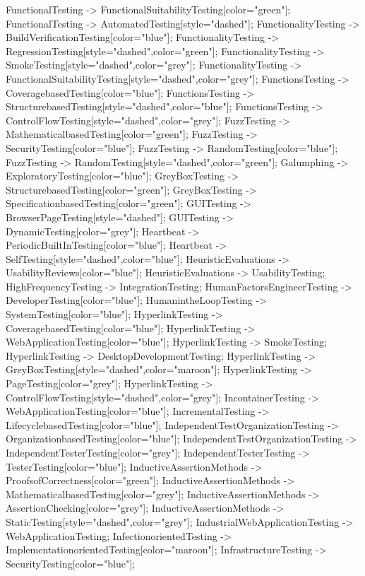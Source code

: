 \documentclass{article}
\begin{document}
{FunctionalTesting -> FunctionalSuitabilityTesting[color="green"];
FunctionalTesting -> AutomatedTesting[style="dashed"];
FunctionalityTesting -> BuildVerificationTesting[color="blue"];
FunctionalityTesting -> RegressionTesting[style="dashed",color="green"];
FunctionalityTesting -> SmokeTesting[style="dashed",color="grey"];
FunctionalityTesting -> FunctionalSuitabilityTesting[style="dashed",color="grey"];
FunctionsTesting -> CoveragebasedTesting[color="blue"];
FunctionsTesting -> StructurebasedTesting[style="dashed",color="blue"];
FunctionsTesting -> ControlFlowTesting[style="dashed",color="grey"];
FuzzTesting -> MathematicalbasedTesting[color="green"];
FuzzTesting -> SecurityTesting[color="blue"];
FuzzTesting -> RandomTesting[color="blue"];
FuzzTesting -> RandomTesting[style="dashed",color="green"];
Galumphing -> ExploratoryTesting[color="blue"];
GreyBoxTesting -> StructurebasedTesting[color="green"];
GreyBoxTesting -> SpecificationbasedTesting[color="green"];
GUITesting -> BrowserPageTesting[style="dashed"];
GUITesting -> DynamicTesting[color="grey"];
Heartbeat -> PeriodicBuiltInTesting[color="blue"];
Heartbeat -> SelfTesting[style="dashed",color="blue"];
HeuristicEvaluations -> UsabilityReviews[color="blue"];
HeuristicEvaluations -> UsabilityTesting;
HighFrequencyTesting -> IntegrationTesting;
HumanFactorsEngineerTesting -> DeveloperTesting[color="blue"];
HumanintheLoopTesting -> SystemTesting[color="blue"];
HyperlinkTesting -> CoveragebasedTesting[color="blue"];
HyperlinkTesting -> WebApplicationTesting[color="blue"];
HyperlinkTesting -> SmokeTesting;
HyperlinkTesting -> DesktopDevelopmentTesting;
HyperlinkTesting -> GreyBoxTesting[style="dashed",color="maroon"];
HyperlinkTesting -> PageTesting[color="grey"];
HyperlinkTesting -> ControlFlowTesting[style="dashed",color="grey"];
IncontainerTesting -> WebApplicationTesting[color="blue"];
IncrementalTesting -> LifecyclebasedTesting[color="blue"];
IndependentTestOrganizationTesting -> OrganizationbasedTesting[color="blue"];
IndependentTestOrganizationTesting -> IndependentTesterTesting[color="grey"];
IndependentTesterTesting -> TesterTesting[color="blue"];
InductiveAssertionMethods -> ProofsofCorrectness[color="green"];
InductiveAssertionMethods -> MathematicalbasedTesting[color="grey"];
InductiveAssertionMethods -> AssertionChecking[color="grey"];
InductiveAssertionMethods -> StaticTesting[style="dashed",color="grey"];
IndustrialWebApplicationTesting -> WebApplicationTesting;
InfectionorientedTesting -> ImplementationorientedTesting[color="maroon"];
InfrastructureTesting -> SecurityTesting[color="blue"];
}
\end{document}
